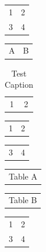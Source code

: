 \documentclass{article}
\begin{document}
\begin{table}[h]
  \begin{tabular}{cc}
    1 & 2 \\
    3 & 4 \\
  \end{tabular}
\end{table}

\begin{table}[htbp]
  \centering
  \begin{tabular}{cc}
    A & B \\
  \end{tabular}
\end{table}

\begin{table}
  \centering
  \begin{tabular}{cc}
    1 & 2 \\
  \end{tabular}
  \caption{Test Caption}
  \label{tab:test_label}
\end{table}

\begin{tabular}[t]{cc}
  1 & 2 \\
\end{tabular}

\begin{tabular}[b]{cc}
  3 & 4 \\
\end{tabular}

\begin{table}
  \begin{tabular}{c}
    Table A \\
  \end{tabular}
  \begin{tabular}{c}
    Table B \\
  \end{tabular}
\end{table}

\begin{tabular}{cc}
  1 & 2 \\
  3 & 4 %
\end{tabular}
\end{document}
